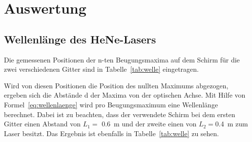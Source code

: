 
\section{Auswertung}
%
\subsection{Wellenlänge des HeNe-Lasers}
%
Die gemessenen Positionen der n-ten Beugungsmaxima auf dem Schirm 
für die zwei verschiedenen Gitter sind in Tabelle~\ref{tab:welle} 
eingetragen.

Wird von diesen Positionen die Position des nullten Maximums 
abgezogen, ergeben sich die Abstände d der Maxima von der 
optischen Achse. Mit Hilfe von Formel~\eqref{eq:wellenlaenge} 
wird pro Beugungsmaximum eine Wellenlänge berechnet. Dabei 
ist zu beachten, dass der verwendete Schirm bei dem ersten Gitter 
einen Abstand von $L_1 = $ \SI{0.6}{\metre} und der zweite einen 
von $L_2 =$\SI{0.4}{\metre} zum Laser besitzt. 
Das Ergebnis ist ebenfalls in Tabelle~\ref{tab:welle} zu sehen.

